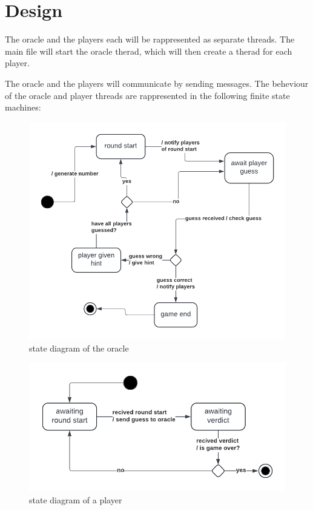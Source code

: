 \documentclass[12pt, a4paper]{report}
\begin{document}
\chapter{Design}
The oracle and the players each will be rappresented as separate threads. The main file will start the oracle therad, which will then create a therad for each player.

The oracle and the players will communicate by sending messages. The beheviour of the oracle and player threads are rappresented in the following finite state machines:

\begin{figure}
    \centering
    \includegraphics{oracleSD.png}
    \caption{state diagram of the oracle}
    \label{fig:oracleSD}
\end{figure}

\begin{figure}
    \centering
    \includegraphics{playerSD.png}
    \caption{state diagram of a player}
    \label{fig:playerSD}
\end{figure}
\end{document}

